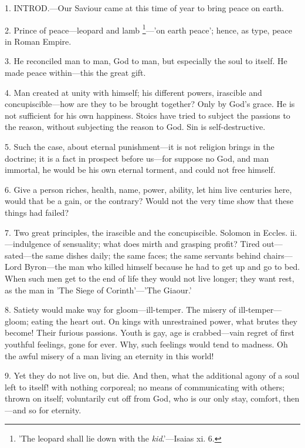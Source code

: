 
1. INTROD.—Our
Saviour came at this time of year to bring peace on earth.

2. Prince of peace—leopard and lamb \footnote{'The leopard shall lie
down with the \emph{kid}.'—Isaias xi. 6.}—'on earth peace'; hence, as type, peace in Roman Empire.

3. He reconciled man to man, God to man, but
especially the soul to itself. He made peace within—this the great
gift.

4. Man created at unity with himself; his
different powers, irascible and concupiscible—how are they to be
brought together? Only by God's grace. He is not sufficient for his
own happiness. Stoics have tried to subject the passions to the
reason, without subjecting the reason to God. Sin is self-destructive.

5. Such the case, about eternal punishment—it
is not religion brings in the doctrine; it is a fact in prospect
before us—for suppose no God, and man immortal, he would be his own
eternal torment, and could not free himself.

6. Give a person riches, health, name, power,
ability, let him live centuries here, would that be a gain, or the
contrary? Would not the very time show that these things had failed?

7. Two great principles, the irascible and the
concupiscible. Solomon in Eccles. ii.—indulgence of sensuality; what
does mirth and grasping profit? Tired out—sated—the same dishes
daily; the same faces; the same servants behind chairs—Lord
Byron—the man who killed himself because he had to get up and go to
bed. When such men get to the end of life they would not live longer;
they want rest, as the man in 'The Siege of Corinth'—'The Giaour.'

8. Satiety would make way for gloom—ill-temper.
The misery of ill-temper—gloom; eating the heart out. On kings with
unrestrained power, what brutes they become! Their furious passions.
Youth is gay, age is crabbed—vain regret of first youthful feelings,
gone for ever. Why, such feelings would tend to madness. Oh the awful
misery of a man living an eternity in this world!

9. Yet they do not live on, but die. And then,
what the additional agony of a soul left to itself! with nothing
corporeal; no means of communicating with others; thrown on itself;
voluntarily cut off from God, who is our only stay, comfort,
then—and so for eternity.

